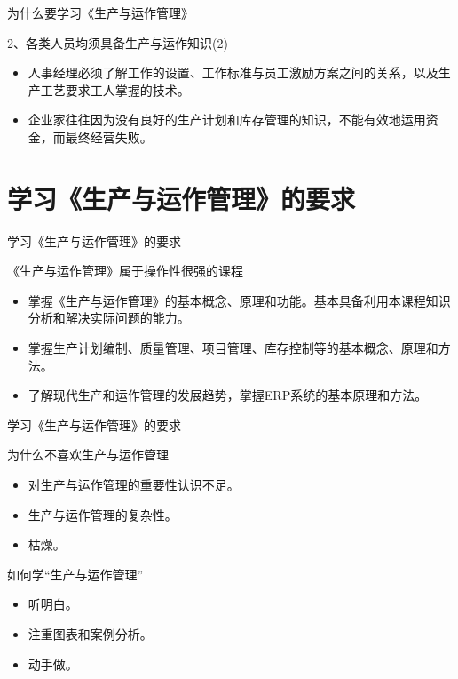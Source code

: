 \documentclass[11pt]{beamer}
\begin{document}
	\begin{frame}{为什么要学习《生产与运作管理》}
		\begin{block}{2、各类人员均须具备生产与运作知识(2)}
			\begin{itemize}
				\item 人事经理必须了解工作的设置、工作标准与员工激励方案之间的关系，以及生产工艺要求工人掌握的技术。
				\item 企业家往往因为没有良好的生产计划和库存管理的知识，不能有效地运用资金，而最终经营失败。
			\end{itemize}  
		\end{block}		
	\end{frame}
	
	\section{学习《生产与运作管理》的要求}
	\begin{frame}{学习《生产与运作管理》的要求}
		\begin{block}{《生产与运作管理》属于操作性很强的课程}
			\begin{itemize}
				\item 掌握《生产与运作管理》的基本概念、原理和功能。基本具备利用本课程知识分析和解决实际问题的能力。
				\item 掌握生产计划编制、质量管理、项目管理、库存控制等的基本概念、原理和方法。
				\item 了解现代生产和运作管理的发展趋势，掌握ERP系统的基本原理和方法。
			\end{itemize}  
		\end{block}		
	\end{frame}
		
	\begin{frame}{学习《生产与运作管理》的要求}
		\begin{block}{为什么不喜欢生产与运作管理}
			\begin{itemize}
				\item 对生产与运作管理的重要性认识不足。
				\item 生产与运作管理的复杂性。
				\item 枯燥。
			\end{itemize}  
		\end{block}	
		\pause
		\begin{block}{如何学“生产与运作管理”}
			\begin{itemize}
				\item 听明白。
				\item 注重图表和案例分析。
				\item 动手做。
			\end{itemize}  
		\end{block}	
	\end{frame}
	
\end{document}
